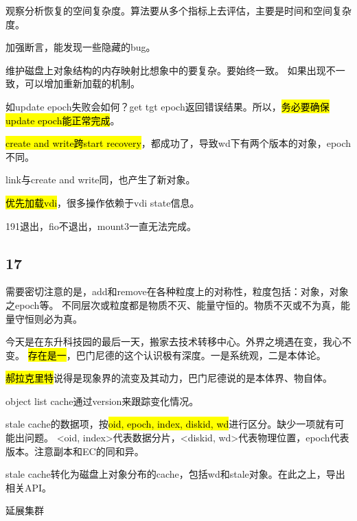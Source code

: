 观察分析恢复的空间复杂度。算法要从多个指标上去评估，主要是时间和空间复杂度。

加强断言，能发现一些隐藏的bug。

维护磁盘上对象结构的内存映射比想象中的要复杂。要始终一致。
如果出现不一致，可以增加重新加载的机制。
\begin{enumbox}
\item 如update epoch失败会如何？get tgt epoch返回错误结果。所以，\hl{务必要确保update epoch能正常完成}。
\item \hl{create and write跨start recovery}，都成功了，导致wd下有两个版本的对象，epoch不同。
\item link与create and write同，也产生了新对象。
\item \hl{优先加载vdi}，很多操作依赖于vdi state信息。
\item 191退出，fio不退出，mount3一直无法完成。
\end{enumbox}

\subsection{17}

需要密切注意的是，add和remove在各种粒度上的对称性，粒度包括：对象，对象之epoch等。
不同层次或粒度都是物质不灭、能量守恒的。物质不灭或不为真，能量守恒则必为真。

今天是在东升科技园的最后一天，搬家去技术转移中心。外界之境遇在变，我心不变。
\hl{存在是一}，巴门尼德的这个认识极有深度。一是系统观，二是本体论。

\hl{郝拉克里特}说得是现象界的流变及其动力，巴门尼德说的是本体界、物自体。

object list cache通过version来跟踪变化情况。

stale cache的数据项，按\hl{oid, epoch, index, diskid, wd}进行区分。缺少一项就有可能出问题。
<oid, index>代表数据分片，<diskid, wd>代表物理位置，epoch代表版本。注意副本和EC的同和异。

stale cache转化为磁盘上对象分布的cache，包括wd和stale对象。在此之上，导出相关API。

\hrulefill

延展集群
